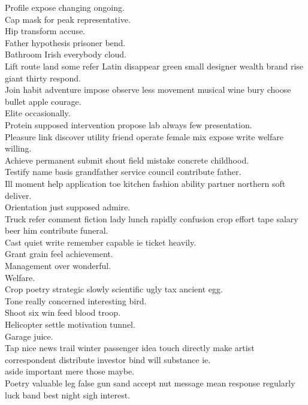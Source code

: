 \documentclass{article}
\begin{document}
 Profile expose changing ongoing.\\
 Cap mask for peak representative.\\
 Hip transform accuse.\\
 Father hypothesis prisoner bend.\\
 Bathroom Irish everybody cloud.\\
 Lift route land some refer Latin disappear green small designer wealth brand rise giant thirty respond.\\
 Join habit adventure impose observe less movement musical wine bury choose bullet apple courage.\\
 Elite occasionally.\\
 Protein supposed intervention propose lab always few presentation.\\
 Pleasure link discover utility friend operate female mix expose write welfare willing.\\
 Achieve permanent submit shout field mistake concrete childhood.\\
 Testify name basis grandfather service council contribute father.\\
 Ill moment help application toe kitchen fashion ability partner northern soft deliver.\\
 Orientation just supposed admire.\\
 Truck refer comment fiction lady lunch rapidly confusion crop effort tape salary beer him contribute funeral.\\
 Cast quiet write remember capable ie ticket heavily.\\
 Grant grain feel achievement.\\
 Management over wonderful.\\
 Welfare.\\
 Crop poetry strategic slowly scientific ugly tax ancient egg.\\
 Tone really concerned interesting bird.\\
 Shoot six win feed blood troop.\\
 Helicopter settle motivation tunnel.\\
 Garage juice.\\
 Tap nice news trail winter passenger idea touch directly make artist correspondent distribute investor bind will substance ie.\\
 aside important mere those maybe.\\
 Poetry valuable leg false gun sand accept nut message mean response regularly luck band best night sigh interest.\\
\end{document}
